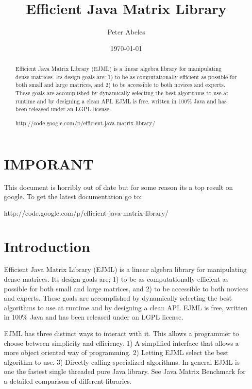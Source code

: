 \documentclass[12pt]{article}%
\title{Efficient Java Matrix Library}
\author{Peter Abeles}
\date{\today}
\begin{document}
\maketitle

\tableofcontents

\begin{abstract}
Efficient Java Matrix Library (EJML) is a linear algebra library for manipulating dense matrices. Its design goals are; 1) to be as computationally efficient as possible for both small and large matrices, and 2) to be accessible to both novices and experts. These goals are accomplished by dynamically selecting the best algorithms to use at runtime and by designing a clean API. EJML is free, written in 100\% Java and has been released under an LGPL license.

http://code.google.com/p/efficient-java-matrix-library/
\end{abstract}

\section{IMPORANT}

This document is horribly out of date but for some reason its a top result on google.  To get the latest documentation go to: 

http://code.google.com/p/efficient-java-matrix-library/

\section{Introduction}

Efficient Java Matrix Library (EJML) is a linear algebra library for manipulating dense matrices. Its design goals are; 1) to be as computationally efficient as possible for both small and large matrices, and 2) to be accessible to both novices and experts. These goals are accomplished by dynamically selecting the best algorithms to use at runtime and by designing a clean API. EJML is free, written in 100\% Java and has been released under an LGPL license.

EJML has three distinct ways to interact with it. This allows a programmer to choose between simplicity and efficiency. 1) A simplified interface that allows a more object oriented way of programming. 2) Letting EJML select the best algorithm to use. 3) Directly calling specialized algorithms. In general EJML is one the fastest single threaded pure Java library. See Java Matrix Benchmark for a detailed comparison of different libraries.
\end{document}
